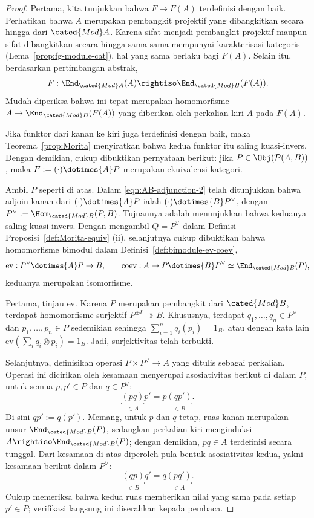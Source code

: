 \begin{proof}
	Pertama, kita tunjukkan bahwa $F\mapsto F(A)$ terdefinisi dengan baik.
	Perhatikan bahwa $A$ merupakan pembangkit projektif yang dibangkitkan
	secara hingga dari $\cated{Mod}A$. Karena sifat menjadi pembangkit
	projektif maupun sifat dibangkitkan secara hingga sama-sama mempunyai
	karakterisasi kategoris (Lema~\ref{prop:fg-module-cat}), hal yang sama
	berlaku bagi $F(A)$. Selain itu, berdasarkan pertimbangan abstrak,
	\[
	F:\End_{\cated{Mod}A}(A)\rightiso
	\End_{\cated{Mod}B}(F(A)).
	\]
	Mudah diperiksa bahwa ini tepat merupakan homomorfisme
	$A\to\End_{\cated{Mod}B}(F(A))$ yang diberikan oleh perkalian kiri $A$
	pada $F(A)$.

	Jika funktor dari kanan ke kiri juga terdefinisi dengan baik, maka
	Teorema~\ref{prop:Morita} menyiratkan bahwa kedua funktor itu saling
	kuasi-invers. Dengan demikian, cukup dibuktikan pernyataan berikut: jika
	$P\in\Obj(\mathcal{P}(A,B))$, maka
	$F:=(\cdot)\dotimes{A}P$ merupakan ekuivalensi kategori.

	Ambil $P$ seperti di atas. Dalam \eqref{eqn:AB-adjunction-2} telah
	ditunjukkan bahwa adjoin kanan dari $(\cdot)\dotimes{A}P$ ialah
	$(\cdot)\dotimes{B}P^\vee$, dengan
	$P^\vee:=\Hom_{\cated{Mod}B}(P,B)$. Tujuannya adalah menunjukkan bahwa
	keduanya saling kuasi-invers. Dengan mengambil $Q=P^\vee$ dalam
	Definisi--Proposisi~\ref{def:Morita-equiv} (ii), selanjutnya cukup dibuktikan
	bahwa homomorfisme bimodul dalam
	Definisi~\ref{def:bimodule-ev-coev},
	\[
	\mathrm{ev}:P^\vee\dotimes{A}P\to B,\qquad
	\mathrm{coev}:A\to P\dotimes{B}P^\vee
	\simeq\End_{\cated{Mod}B}(P),
	\]
	keduanya merupakan isomorfisme.

	Pertama, tinjau $\mathrm{ev}$. Karena $P$ merupakan pembangkit dari
	$\cated{Mod}B$, terdapat homomorfisme surjektif
	$P^{\oplus I}\twoheadrightarrow B$. Khususnya, terdapat
	$q_1,\ldots,q_n\in P^\vee$ dan $p_1,\ldots,p_n\in P$ sedemikian sehingga
	$\sum_{i=1}^n q_i(p_i)=1_B$, atau dengan kata lain
	$\mathrm{ev}(\sum_i q_i\otimes p_i)=1_B$. Jadi, surjektivitas telah
	terbukti.

	Selanjutnya, definisikan operasi $P\times P^\vee\to A$ yang ditulis
	sebagai perkalian. Operasi ini dicirikan oleh kesamaan menyerupai
	asosiativitas berikut di dalam $P$, untuk semua $p,p'\in P$ dan
	$q\in P^\vee$:
	\[
	\underbracket{(pq)}_{\in A}p'
	= p\underbracket{(qp')}_{\in B}.
	\]
	Di sini $qp':=q(p')$. Memang, untuk $p$ dan $q$ tetap, ruas kanan
	merupakan unsur $\End_{\cated{Mod}B}(P)$, sedangkan perkalian kiri
	menginduksi $A\rightiso\End_{\cated{Mod}B}(P)$; dengan demikian,
	$pq\in A$ terdefinisi secara tunggal. Dari kesamaan di atas diperoleh
	pula bentuk asosiativitas kedua, yakni kesamaan berikut dalam $P^\vee$:
	\[
	\underbracket{(qp)}_{\in B}q'
	= q\underbracket{(pq')}_{\in A}.
	\]
	Cukup memeriksa bahwa kedua ruas memberikan nilai yang sama pada setiap
	$p'\in P$; verifikasi langsung ini diserahkan kepada pembaca.


\end{proof}
